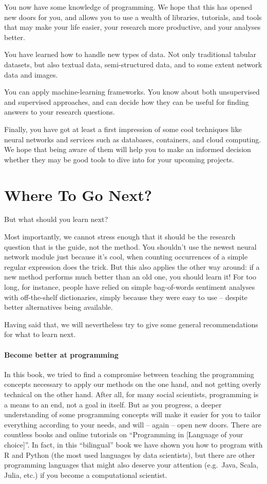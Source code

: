You now have some knowledge of programming. We hope that this has opened new doors for you, and allows you to use a wealth of libraries, tutorials, and tools that may make your life easier, your research more productive, and your analyses better.

You have learned how to handle new types of data. Not only traditional tabular datasets, but also textual data, semi-structured data, and to some extent network data and images.

You can apply machine-learning frameworks. You know about both unsupervised and supervised approaches, and can decide  how they can be useful for finding answers to your research questions.

Finally, you have got at least a first impression of some cool techniques like neural networks and services such as databases, containers, and cloud computing. We hope that being aware of them will help you to make an informed decision whether they may be good tools to dive into for your upcoming projects.



\section{Where To Go Next?}
But what should you learn next?

Most importantly, we cannot stress enough that it should be the research question that is the guide, not the method. You shouldn't use the newest neural network module just because it's cool, when counting occurrences of a simple regular expression does the trick. But this also applies the other way around: if a new method performs much better than an old one, you should learn it! For too long, for instance, people have relied on simple bag-of-words sentiment analyses with off-the-shelf dictionaries, simply because they were easy to use -- despite better alternatives being available.

Having said that, we will nevertheless try to give some general recommendations for what to learn next.

\paragraph{Become better at programming} In this book, we tried to find a compromise between teaching the programming concepts necessary to apply our methods on the one hand, and not getting overly technical on the other hand. After all, for many social scientists, programming is a means to an end, not a goal in itself. But as you progress, a deeper understanding of some programming concepts will make it easier for you to tailor everything according to your needs, and will -- again -- open new doors. There are countless books and online tutorials on ``Programming in [Language of your choice]''. In fact, in this ``bilingual'' book we have shown you how to program with R and Python (the most used languages by data scientists), but there are other programming languages that might also deserve your attention (e.g.\ Java, Scala, Julia, etc.) if you become a computational scientist.


